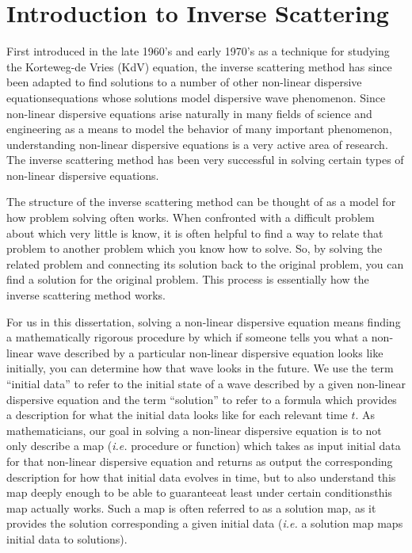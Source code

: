 \documentclass[../dissertation.tex]{subfiles}
\begin{document}
\section{Introduction to Inverse Scattering}\label{sec0:IST}

First introduced in the late 1960's and early 1970's as a technique for studying 
the Korteweg-de Vries (KdV) equation, the inverse scattering method has since 
been adapted to find solutions to a number of other non-linear dispersive 
equations\textemdash{}equations whose solutions model dispersive wave 
phenomenon. Since non-linear dispersive equations arise naturally in many fields 
of science and engineering as a means to model the behavior of many important 
phenomenon, understanding non-linear dispersive equations is a very active 
area of research. 
The inverse scattering method has been very successful in solving certain types 
of non-linear dispersive equations.

The structure of the inverse scattering method can be thought of as a model 
for how problem solving often works. When confronted with a difficult problem
about which very little is know, it is often helpful to find a way to relate
that problem to another problem which you know how to solve. So, by solving 
the related problem and connecting its solution back to the original problem, 
you can find a solution for the original problem. This process is essentially
how the inverse scattering method works. 

For us in this dissertation, solving a non-linear dispersive equation means 
finding a mathematically rigorous procedure by which if someone tells you what 
a non-linear wave described by a particular non-linear dispersive equation looks 
like initially, you can determine how that wave looks in the future. We use the 
term ``initial data'' to refer to the initial state of a wave described by a 
given non-linear dispersive equation and the term ``solution'' to refer to 
a formula which provides a description for what the initial data looks like 
for each relevant time $t$.
As mathematicians, our goal in solving a 
non-linear dispersive equation is to not only describe a map (\textit{i.e.} 
procedure or function) which takes as input initial data for that non-linear 
dispersive equation and returns as output the corresponding description for how 
that initial data evolves in time, but to also understand this map deeply enough 
to be able to guarantee\textemdash{}at least under certain 
conditions\textemdash{}this map actually works. Such a map is often 
referred to as a solution map, as it provides the solution corresponding a given
initial data (\textit{i.e.} a solution map maps initial data to solutions). 
\end{document}
